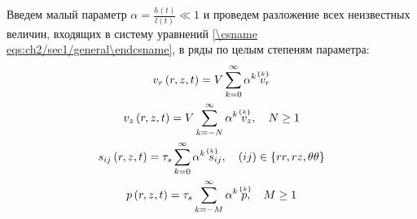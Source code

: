 Введем малый параметр $\alpha = \frac{h(t)}{l(t)} \ll 1$ и проведем разложение всех неизвестных величин, входящих в систему уравнений \cref{\csname eqs:ch2/sec1/general\endcsname}, в ряды по целым степеням параметра:
\begin{gather}
  \label{eqs:ch2/series/vr}
  v_{r}\left(r, z, t\right) = V \sum_{k=0}^{\infty}{\alpha^{k} \; \uindex{v}{k}_{r}}
  \\
  \label{eqs:ch2/series/vz}
  v_{z}\left(r, z, t\right) = V \sum_{k=-N}^{\infty}{\alpha^{k} \; \uindex{v}{k}_{z}}, \quad N \ge 1
  \\
  \label{eqs:ch2/series/sij}
  s_{ij}\left(r, z, t\right) = \tau_{s} \sum_{k=0}^{\infty}{\alpha^{k} \; \uindex{s}{k}_{ij}}, \quad (ij)\in\{rr, rz, \theta\theta\}
  \\
  \label{eqs:ch2/series/p}
  p\left(r, z, t \right) = \tau_{s} \sum_{k=-M}^{\infty}{\alpha^{k} \; \uindex{p}{k}}, \quad M \ge 1
\end{gather}

